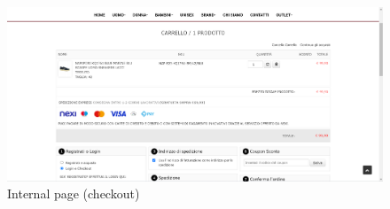 \begin{figure}[!h] 
    \centering 
    \includegraphics[scale = 0.29]{images/checkout.png} 
    \caption{Internal page (checkout)}
    \label{internal-checkout}
\end{figure}

